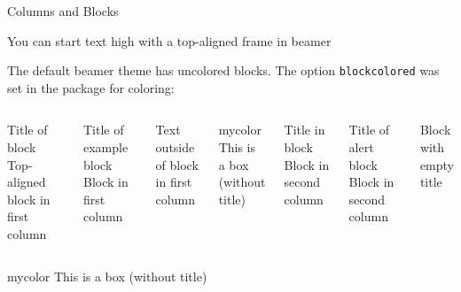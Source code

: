 \documentclass[aspectratio=169]{beamer}
\begin{document}
\begin{frame}[t]{Columns and Blocks}

You can start text high with a top-aligned frame in beamer

 The default beamer theme has uncolored blocks. The option \texttt{blockcolored} was set in the package for coloring: 
  \begin{columns}
      \begin{block}{Title of block}
        Top-aligned block in first column
      \end{block}
      \begin{exampleblock}{Title of example block}
        Block in first column
      \end{exampleblock}
      Text outside of block in first column
      \vspace{1ex}
      
      \begin{beamercolorbox}[wd=\linewidth, colsep*=4pt]{mycolor}
         This is a box (without title)
       \end{beamercolorbox}
      \begin{block}{Title in block}
        Block in second column 
      \end{block}
      \begin{alertblock}{Title of alert block}
        Block in second column
      \end{alertblock}
      \begin{block}{}
        Block with empty title
      \end{block}
    \end{columns}
    
    \vspace{1ex}
    \begin{beamercolorbox}[wd=\linewidth, colsep*=4pt]{mycolor}
      This is a box (without title)
    \end{beamercolorbox}
 \end{frame}
 
\end{document}
